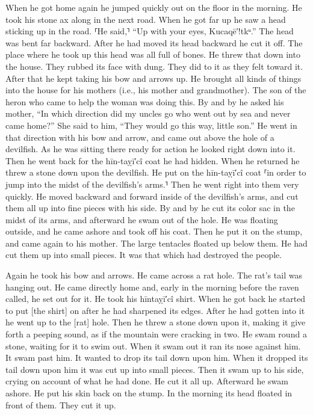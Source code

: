 When he got home again he jumped quickly out on the floor in the morning.
He took his stone ax along in the next road.
When he got far up he saw a head sticking up in the road.
⸢He said,⸣ “Up with your eyes, Kucaqē′!tkᵘ.”
The head was bent far backward.
After he had moved its head backward he cut it off.
The place where he took up this head was all full of bones.
He threw that down into the house.
They rubbed its face with dung.
They did to it as they felt toward it.
After that he kept taking his bow and arrows up.
He brought all kinds of things into the house for his mothers (i.e., his mother and grandmother).
The son of the heron who came to help the woman was doing this.
By and by he asked his mother,
\qqk{}“In which direction did my uncles go who went out by sea and never came home?” She said to him,
\qqk{}“They would go this way, little son.”
He went in that direction with his bow and arrow,
and came out above the hole of a devilfish.
As he was sitting there ready for action he looked right down into it.
Then he went back for the hīn-taỵī′cî coat he had hidden.
When he returned he threw a stone down upon the devilfish.
He put on the hīn-taỵī′cî coat
⸢in order to jump into the midst of the devilfish’s arms.⸣
Then he went right into them very quickly.
He moved backward and forward inside of the devilfish’s arms,
and cut them all up into fine pieces with his side.
By and by he cut its color sac in the midst of its arms,
and afterward he swam out of the hole.
He was floating outside,
and he came ashore 
and took off his coat.
Then he put it on the stump,
and came again to his mother.
The large tentacles floated up below them.
He had cut them up into small pieces.
It was that which had destroyed the people.

Again he took his bow and arrows.
He came across a rat hole.
The rat’s tail was hanging out.
He came directly home
and, early in the morning before the raven called, he set out for it.
He took his hīntaỵī′cî shirt.
When he got back he started to put [the shirt] on
after he had sharpened its edges.
After he had gotten into it he went up to the [rat] hole.
Then he threw a stone down upon it,
making it give forth a peeping sound, as if the mountain were cracking in two.
He swam round a stone, waiting for it to swim out.
When it swam out it ran its nose against him.
It swam past him.
It wanted to drop its tail down upon him.
When it dropped its tail down upon him it was cut up into small pieces.
Then it swam up to his side, crying on account of what he had done.
He cut it all up.
Afterward he swam ashore.
He put his skin back on the stump.
In the morning its head floated in front of them.
They cut it up.


